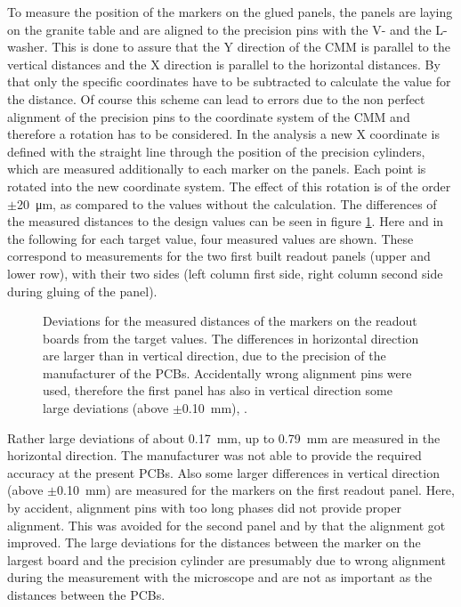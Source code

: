 \documentclass[
a4paper,                                %
twoside,                                %
BCOR1.4cm,                      %
10pt,                           %
headings=normal,                %
headsepline,                    %
clearplainpage, %
final,                                  %
div=14,
parskip=full,
openright,
bibliography=toc
]{scrreprt}
\begin{document}
To measure the position of the markers on the glued panels, the panels are laying on the granite table and are aligned to the precision pins with the V- and the L-washer. This is done to assure that the Y direction of the CMM is parallel to the vertical distances and the X direction is parallel to the horizontal distances. By that only the specific coordinates have to be subtracted to calculate the value for the distance. Of course this scheme can lead to errors due to the non perfect alignment of the precision pins to the coordinate system of the CMM and therefore a rotation has to be considered. In the analysis a new X coordinate is defined with the straight line through the position of the precision cylinders, which are measured additionally to each marker on the panels. Each point is rotated into the new coordinate system. The effect of this rotation is of the order $\pm$\SI{20}{\micro\m}, as compared to the values without the calculation. The differences of the measured distances to the design values can be seen in figure \ref{panelMeasMunich}. Here and in the following for each target value, four measured values are shown. These correspond to measurements for the two first built readout panels (upper and lower row), with their two sides (left column first side, right column second side during gluing of the panel). 

\begin{figure}[H]	
	\centering
	\qquad
	\caption{Deviations for the measured distances of the markers on the readout boards from the target values. The differences in horizontal direction are larger than in vertical direction, due to the precision of the manufacturer of the PCBs. Accidentally wrong alignment pins were used, therefore the first panel has also in vertical direction some large deviations (above $\pm$\SI{0.10}{\mm}), .}
	\label{panelMeasMunich}
\end{figure}

Rather large deviations of about \SI{+0.17}{\mm}, up to \SI{+0.79}{\mm} are measured in the horizontal direction. The manufacturer was not able to provide the required accuracy at the present PCBs. Also some larger differences in vertical direction (above $\pm$\SI{0.10}{\mm}) are measured for the markers on the first readout panel. Here, by accident, alignment pins with too long phases did not provide proper alignment. This was avoided for the second panel and by that the alignment got improved. The large deviations for the distances between the marker on the largest board and the precision cylinder are presumably due to wrong alignment during the measurement with the microscope and are not as important as the distances between the PCBs.
\end{document}
